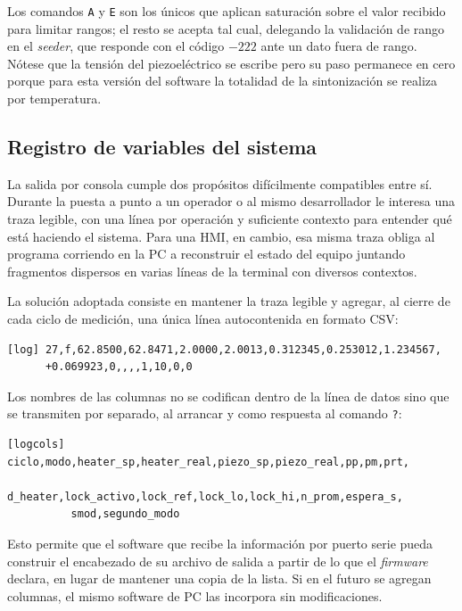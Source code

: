Los comandos \texttt{A} y \texttt{E} son los únicos que aplican saturación sobre el valor recibido para limitar rangos; el resto se acepta tal cual, delegando la validación de rango en el \emph{seeder}, que responde con el código $-222$ ante un dato fuera de rango. Nótese que la tensión del piezoeléctrico se escribe pero su paso permanece en cero porque para esta versión del software la totalidad de la sintonización se realiza por temperatura.

\subsection{Registro de variables del sistema}
\label{sec:fw-log}

La salida por consola cumple dos propósitos difícilmente compatibles entre sí. Durante la puesta a punto a un operador o al mismo desarrollador le interesa una traza legible, con una línea por operación y suficiente contexto para entender qué está haciendo el sistema. Para una HMI, en cambio, esa misma traza obliga al programa corriendo en la PC a reconstruir el estado del equipo juntando fragmentos dispersos en varias líneas de la terminal con diversos contextos.

La solución adoptada consiste en mantener la traza legible y agregar, al cierre de cada ciclo de medición, una única línea autocontenida en formato CSV:

\begin{lstlisting}[basicstyle=\ttfamily\scriptsize,columns=fullflexible,
  breaklines=true,frame=single,rulecolor=\color{black!30}]
[log] 27,f,62.8500,62.8471,2.0000,2.0013,0.312345,0.253012,1.234567,
      +0.069923,0,,,,1,10,0,0
\end{lstlisting}

Los nombres de las columnas no se codifican dentro de la línea de datos sino que se transmiten por separado, al arrancar y como respuesta al comando \texttt{?}:

\begin{lstlisting}[basicstyle=\ttfamily\scriptsize,columns=fullflexible,
  breaklines=true,frame=single,rulecolor=\color{black!30}]
[logcols] ciclo,modo,heater_sp,heater_real,piezo_sp,piezo_real,pp,pm,prt,
          d_heater,lock_activo,lock_ref,lock_lo,lock_hi,n_prom,espera_s,
          smod,segundo_modo
\end{lstlisting}

Esto permite que el software que recibe la información por puerto serie pueda construir el encabezado de su archivo de salida a partir de lo que el \emph{firmware} declara, en lugar de mantener una copia de la lista. Si en el futuro se agregan columnas, el mismo software de PC las incorpora sin modificaciones. 

